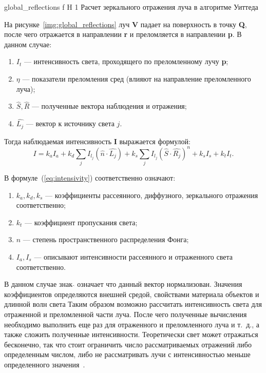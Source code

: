 {global_reflections} %
{f} %
{H} %
{1\textwidth} %
{Расчет зеркального отражения луча в алгоритме Уиттеда} %


На рисунке~\ref{img:global_reflections} луч \textbf{V} падает на поверхность в точку \textbf{Q}, после чего отражается в направлении \textbf{r} и преломляется
в направлении \textbf{p}.
В данном случае:
\begin{enumerate}
	\item $I_t$ --- интенсивность света, проходящего по преломленному лучу \textbf{p};
	\item $\eta$ --- показатели преломления сред (влияют на направление преломленного луча);
	\item $\hat{S},\hat{R}$ --- полученные вектора наблюдения и отражения;
	\item $\hat{L_j}$ --- вектор к источнику света $j$.

\end{enumerate}

Тогда наблюдаемая интенсивность \textbf{I} выражается формулой:
\begin{equation} 
	I = k_aI_a + k_d \sum_{j} I_{l_j}(\hat{n} \cdot \hat{L_j}) + k_s \sum_{j} I_{l_j}(\hat{S} \cdot \hat{R_j})^n + k_sI_s + k_tI_t.
	\label{eq:intensivity}
\end{equation}

В формуле~(\ref{eq:intensivity}) соответственно означают:
\begin{enumerate}
	\item $k_a,k_d,k_s$ --- коэффициенты рассеянного, диффузного, зеркального отражения соответственно;
	\item $k_t$ --- коэффициент пропускания света;
	\item $n$ --- степень пространственного распределения Фонга;
	\item $I_{a},I_{s}$ --- описывают интенсивности рассеянного и отраженного света соответственно.
\end{enumerate}
В данном случае знак $ \hat{} $  означает что данный вектор нормализован.
Значения коэффициентов определяются внешней средой, свойствами материала объектов и длинной волн света
Таким образом возможно рассчитать интенсивность света для отраженной и преломленной части луча.
После чего полученные вычисления необходимо выполнить еще раз для отраженного и преломленного луча и т.~д., а также сложить полученные интенсивности.
Теоретически свет может отражаться бесконечно, так что стоит ограничить число рассматриваемых отражений либо определенным числом,
либо не рассматривать лучи с интенсивностью меньше определенного значения~\cite{Rodgers}.





